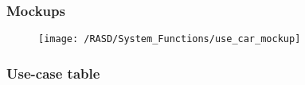 \subsubsection{Mockups}
\begin{figure}[!ht]
  \centering
  \vspace{0.2cm}
  \texttt{[image: /RASD/System\_Functions/use\_car\_mockup]}\\
  \vspace{0.2cm}
  \label{fig:use_car_mockup} 
\end{figure}


\subsubsection{Use-case table}
